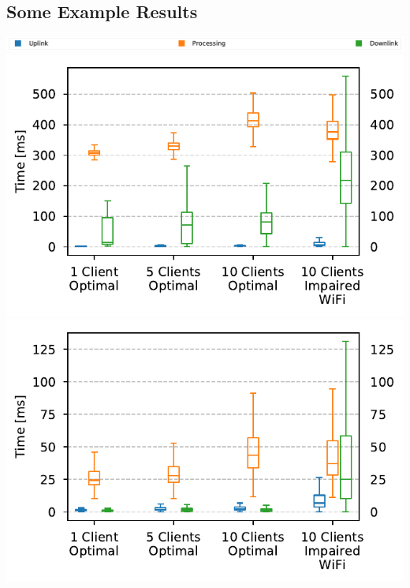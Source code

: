 \documentclass[portrait, a1]{KTHEEposter}
\begin{document}
\begin{pcolumns}[3]
\begin{pcolumn}[2]
\begin{pframe}
                \section{Some Example Results}
                \begin{center}
                    \includegraphics[width=\linewidth]{plots/comparison/box_legend.pdf}
                    \includegraphics[width=\linewidth]{plots/comparison/box_feedback.pdf}
                    \includegraphics[width=\linewidth]{plots/comparison/box_nofeedback.pdf}
                \end{center}
            \end{pframe}
            \begin{pframe**}
            \end{pframe**}
        \end{pcolumn}
    \end{pcolumns}
    
\end{document}

